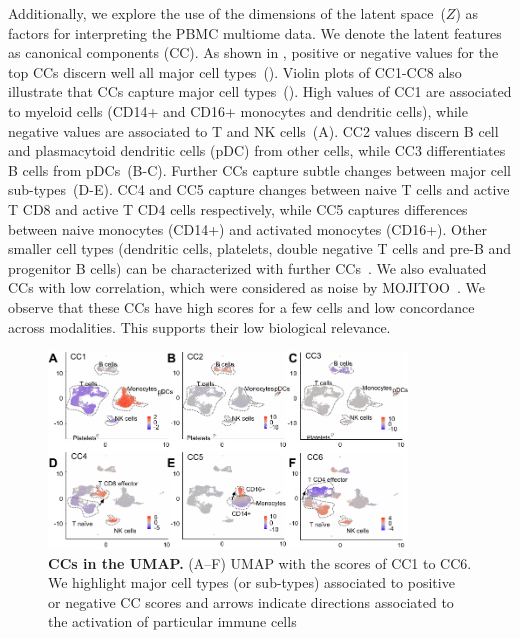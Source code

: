 Additionally, we explore the use of the dimensions of the latent space~($Z$) as factors for interpreting the PBMC multiome data. We denote the latent features as canonical components (CC). As shown in , positive or negative values for the top CCs discern well all major cell types~(). Violin plots of CC1-CC8 also illustrate that CCs capture major cell types~(). High values of CC1 are associated to myeloid cells (CD14+ and CD16+ monocytes and dendritic cells), while negative values are associated to T and NK cells~(A). CC2 values discern B cell and plasmacytoid dendritic cells (pDC) from other cells, while CC3 differentiates B cells from pDCs~(B-C). Further CCs capture subtle changes between major cell sub-types~(D-E). CC4 and CC5 capture changes between naive T cells and active T CD8 and active T CD4 cells respectively, while CC5 captures differences between naive monocytes (CD14+) and activated monocytes (CD16+). Other smaller cell types (dendritic cells, platelets, double negative T cells and pre-B and progenitor B cells) can be characterized with further CCs~. We also evaluated CCs with low correlation, which were considered as noise by MOJITOO~. We observe that these CCs have high scores for a few cells and low concordance across modalities. This supports their low biological relevance.


\begin{figure}[!h]
	\centering
	\includegraphics[width=0.85\textwidth]{CC_UMAP/fig}
	\vspace{0.1cm}
	\caption[CCs in the UMAP.]{\textbf{CCs in the UMAP.} (A–F) UMAP with the scores of CC1 to CC6. We highlight major cell types (or sub-types) associated to positive or negative CC scores and arrows indicate directions associated to the activation of particular immune cells}
	\label{fig:CC_UMAP}
\end{figure}


